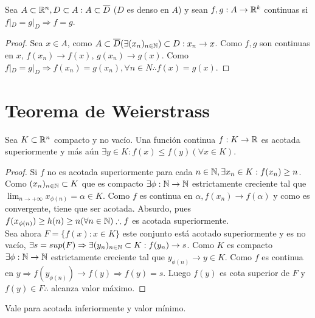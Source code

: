 \clearpage

\begin{prop}
  Sea $A \subset \mathbb{R}^n, D \subset A : A \subset \overline{D}$ ($D$ es denso en $A$) y sean $f, g : A \to \mathbb{R}^k$ continuas si $f|_D = g|_D \Rightarrow f=g$.

  \begin{proof}
    Sea $x \in A$, como $A \subset \overline{D} (\exists (x_n)_{n \in \mathbb{N}}) \subset D : x_n \to x$. Como $f, g$ son continuas en $x$, $f(x_n) \to f(x)$, $g(x_n) \to g(x)$. Como $f|_D = g|_D \Rightarrow f(x_n) = g(x_n), \forall n \in N \therefore f(x) = g(x)$.
  \end{proof}
\end{prop}

\section{Teorema de Weierstrass}

\begin{theorem}[Weiertrass]
  Sea $K \subset \mathbb{R}^n$ compacto y no vacío. Una función continua $f: K \to \mathbb{R}$ es acotada superiormente y más aún $\exists y \in K : f(x) \leq f(y) (\forall x \in K)$.
  \begin{proof}
    Si $f$ no es acotada superiormente para cada $n \in \mathbb{N}, \exists x_n \in K : f(x_n) \geq n$. Como $(x_n)_{n \in \mathbb{N}} \subset K$ que es compacto $\exists \phi: \mathbb{N} \to \mathbb{N}$ estrictamente creciente tal que $\lim_{n \to +\infty} x_{\phi(n)} = \alpha \in K$. Como $f$ es continua en $\alpha, f(x_n) \to f(\alpha)$ y como es convergente, tiene que ser acotada. Absurdo, pues $f(x_{\phi(n)}) \geq h(n) \geq n (\forall n \in \mathbb{N}) \therefore f$ es acotada superiormente. \\
    Sea ahora $F = \{ f(x) : x \in K\}$ este conjunto está acotado superiormente y es no vacío, $\exists s = sup(F) \Rightarrow \exists (y_n)_{n \in \mathbb{N}} \subset K : f(y_n) \to s$. Como $K$ es compacto $\exists \phi : \mathbb{N} \to \mathbb{N}$ estrictamente creciente tal que $y_{\phi(n)} \to y \in K$. Como $f$ es continua en $y \Rightarrow f(y_{\phi(n)}) \to f(y) \Rightarrow f(y) = s$. Luego $f(y)$ es cota superior de $F$ y $f(y) \in F \therefore$ alcanza valor máximo.
  \end{proof}
\end{theorem}

\begin{note}
  Vale para acotada inferiormente y valor mínimo.
\end{note}

